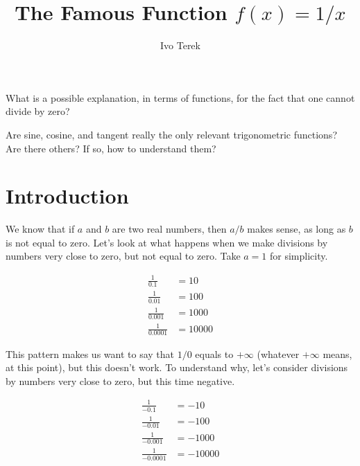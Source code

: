 \documentclass{ximera}
\author{Ivo Terek}
\title{The Famous Function $f(x)=1/x$}
\begin{document}
\begin{abstract}
  
\end{abstract}
\maketitle



\begin{motivatingQuestions}
\item What is a possible explanation, in terms of functions, for the fact that one cannot divide by zero? 
\item Are sine, cosine, and tangent really the only relevant trigonometric functions? Are there others? If so, how to understand them?
\end{motivatingQuestions}



\section{Introduction}

We know that if $a$ and $b$ are two real numbers, then $a/b$ makes sense, as long as $b$ is not equal to zero. Let's look at what happens when we make divisions by numbers very close to zero, but not equal to zero. Take $a=1$ for simplicity.

\begin{align*}
  \frac{1}{0.1} &= 10 \\ \frac{1}{0.01} &= 100 \\ \frac{1}{0.001} &= 1000 \\ \frac{1}{0.0001} &= 10000
\end{align*}

This pattern makes us want to say that $1/0$ equals to $+\infty$ (whatever $+\infty$ means, at this point), but this doesn't work. To understand why, let's consider divisions by numbers very close to zero, but this time negative. 

\begin{align*}
  \frac{1}{-0.1} &= -10 \\ \frac{1}{-0.01} &= -100 \\ \frac{1}{-0.001} &= -1000 \\ \frac{1}{-0.0001} &= -10000
\end{align*}
\end{document}
